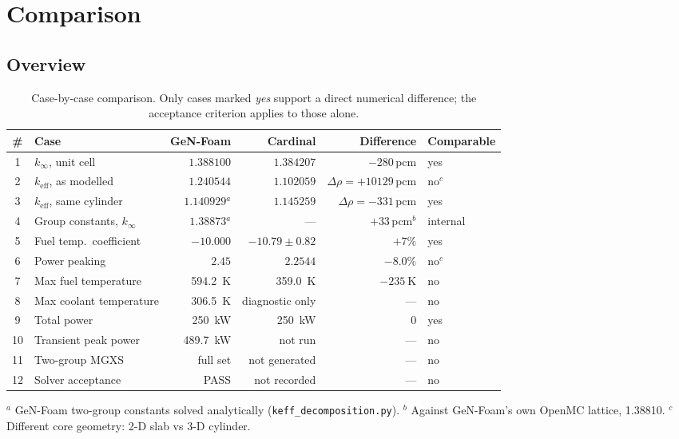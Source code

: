 \documentclass[11pt,a4paper]{article}
\newcommand{\keff}{\ensuremath{k_{\mathrm{eff}}}}
\newcommand{\kinf}{\ensuremath{k_{\infty}}}
\newcommand{\pcm}{\,pcm}
\begin{document}
\newpage
\section{Comparison}\label{sec:comp}
\subsection{Overview}
\begin{table}[H]\centering\small
\caption{Case-by-case comparison. Only cases marked \emph{yes} support a direct numerical
difference; the acceptance criterion applies to those alone.}
\begin{tabular}{@{}clrrrl@{}}
\toprule
\textbf{\#} & \textbf{Case} & \textbf{GeN-Foam} & \textbf{Cardinal} & \textbf{Difference} & \textbf{Comparable}\\
\midrule
\rowcolor{rowbg}
1 & \kinf, unit cell & $1.388100$ & $1.384207$ & $-280$\pcm & yes\\
2 & \keff, as modelled & $1.240544$ & $1.102059$ & $\Delta\rho=+10129$\pcm & no$^c$\\
3 & \keff, same cylinder & $1.140929$$^a$ & $1.145259$ & $\Delta\rho=-331$\pcm & yes\\
4 & Group constants, \kinf & $1.38873$$^a$ & --- & $+33$\pcm$^b$ & internal\\
5 & Fuel temp.\ coefficient & $-10.000$ & $-10.79\pm0.82$ & $+7\%$ & yes\\
6 & Power peaking & $2.45$ & $2.2544$ & $-8.0\%$ & no$^c$\\
7 & Max fuel temperature & \SI{594.2}{\kelvin} & \SI{359.0}{\kelvin} & $-\SI{235}{\kelvin}$ & no\\
8 & Max coolant temperature & \SI{306.5}{\kelvin} & diagnostic only & --- & no\\
9 & Total power & \SI{250}{\kilo\watt} & \SI{250}{\kilo\watt} & $0$ & yes\\
10 & Transient peak power & \SI{489.7}{\kilo\watt} & not run & --- & no\\
11 & Two-group MGXS & full set & not generated & --- & no\\
12 & Solver acceptance & PASS & not recorded & --- & no\\
\bottomrule
\end{tabular}

\vspace{1mm}\footnotesize $^a$ GeN-Foam two-group constants solved analytically
(\texttt{keff\_decomposition.py}). $^b$ Against GeN-Foam's own OpenMC lattice, 1.38810.
$^c$ Different core geometry: 2-D slab vs 3-D cylinder.
\end{table}
\end{document}
